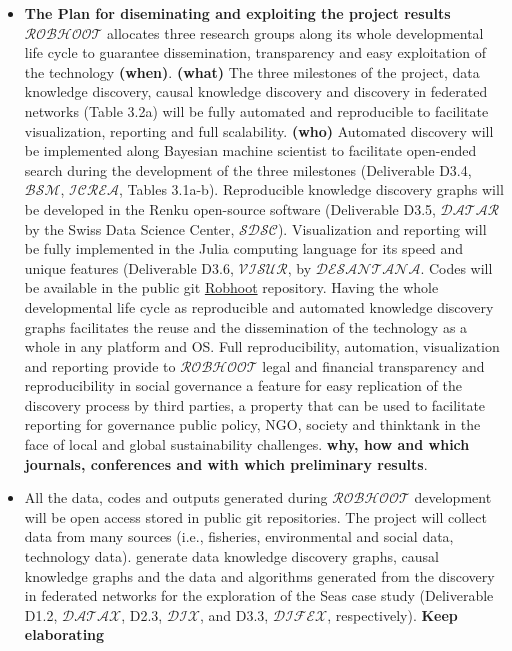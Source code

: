\documentclass[11pt, a4paper]{article} %
\begin{document}
\begin{itemize}
\item {\bf The Plan for diseminating and exploiting the project
    results} $\mathcal{ROBHOOT}$ allocates three research groups along
  its whole developmental life cycle to guarantee dissemination,
  transparency and easy exploitation of the technology {\bf
    (when)}. {\bf (what)} The three milestones of the project, data
  knowledge discovery, causal knowledge discovery and discovery in
  federated networks (Table 3.2a) will be fully automated and
  reproducible to facilitate visualization, reporting and full
  scalability. {\bf (who)} Automated discovery will be implemented
  along Bayesian machine scientist to facilitate open-ended search
  during the development of the three milestones (Deliverable D3.4,
  $\mathcal{BSM}$, $\mathcal{ICREA}$, Tables 3.1a-b). Reproducible
  knowledge discovery graphs will be developed in the Renku
  open-source software (Deliverable D3.5, $\mathcal{DATAR}$ by the
  Swiss Data Science Center, $\mathcal{SDSC}$). Visualization and
  reporting will be fully implemented in the Julia computing language
  for its speed and unique features (Deliverable D3.6,
  $\mathcal{VISUR}$, by $\mathcal{DESANTANA}$. Codes will be available
  in the public git \href{https://github.com/RobhooX/Robhoot}{Robhoot}
  repository. Having the whole developmental life cycle as
  reproducible and automated knowledge discovery graphs facilitates
  the reuse and the dissemination of the technology as a whole in any
  platform and OS. Full reproducibility, automation, visualization and
  reporting provide to $\mathcal{ROBHOOT}$ legal and financial
  transparency and reproducibility in social governance a feature for
  easy replication of the discovery process by third parties, a
  property that can be used to facilitate reporting for governance
  public policy, NGO, society and thinktank in the face of local and
  global sustainability challenges. {\bf why, how and which journals,
    conferences and with which preliminary results}.
  
\item All the data, codes and outputs generated during
  $\mathcal{ROBHOOT}$ development will be open access stored in public
  git repositories. The project will collect data from many sources
  (i.e., fisheries, environmental and social data, technology data).
  generate data knowledge discovery graphs, causal knowledge graphs
  and the data and algorithms generated from the discovery in
  federated networks for the exploration of the Seas case study
  (Deliverable D1.2, $\mathcal{DATAX}$, D2.3, $\mathcal{DIX}$, and
  D3.3, $\mathcal{DIFEX}$, respectively). {\bf Keep elaborating}
  \end{itemize}
\end{document}

